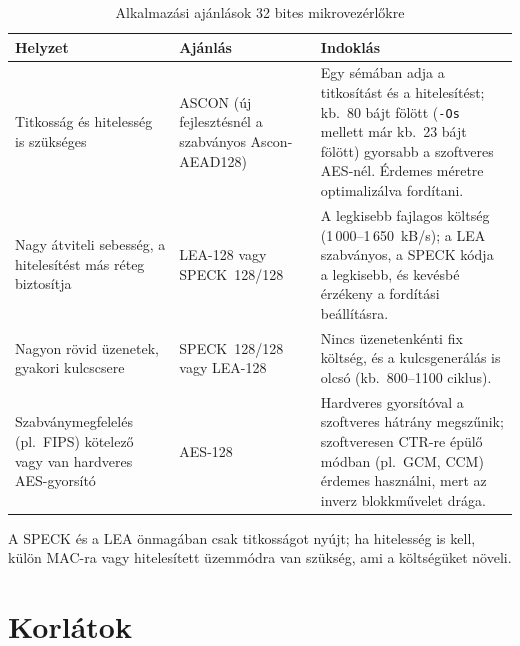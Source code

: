 \documentclass[a4paper,12pt]{report}
\theoremstyle{definition}
\theoremstyle{remark}
\begin{document}
\begin{table}[htbp]
    \centering
    \small
    \caption{Alkalmazási ajánlások 32 bites mikrovezérlőkre}
    \label{tab:ajanlasok}
    \begin{tabularx}{\textwidth}{|p{4.2cm}|p{3.0cm}|X|}
        \hline
        \textbf{Helyzet} & \textbf{Ajánlás} & \textbf{Indoklás} \\ \hline
        Titkosság és hitelesség is szükséges & ASCON (új fejlesztésnél a szabványos Ascon-AEAD128) & Egy sémában adja a titkosítást és a hitelesítést; kb.\ 80 bájt fölött (\texttt{-Os} mellett már kb.\ 23 bájt fölött) gyorsabb a szoftveres AES-nél. Érdemes méretre optimalizálva fordítani. \\ \hline
        Nagy átviteli sebesség, a hitelesítést más réteg biztosítja & LEA-128 vagy SPECK~128/128 & A legkisebb fajlagos költség (1\,000--1\,650~kB/s); a LEA szabványos, a SPECK kódja a legkisebb, és kevésbé érzékeny a fordítási beállításra. \\ \hline
        Nagyon rövid üzenetek, gyakori kulcscsere & SPECK~128/128 vagy LEA-128 & Nincs üzenetenkénti fix költség, és a kulcsgenerálás is olcsó (kb.\ 800--1100 ciklus). \\ \hline
        Szabványmegfelelés (pl.\ FIPS) kötelező vagy van hardveres AES-gyorsító & AES-128 & Hardveres gyorsítóval a szoftveres hátrány megszűnik; szoftveresen CTR-re épülő módban (pl.\ GCM, CCM) érdemes használni, mert az inverz blokkművelet drága. \\ \hline
    \end{tabularx}
\end{table}

A SPECK és a LEA önmagában csak titkosságot nyújt; ha hitelesség is kell, külön MAC-ra vagy hitelesített üzemmódra van szükség, ami a költségüket növeli.

\section{Korlátok}
\end{document}
